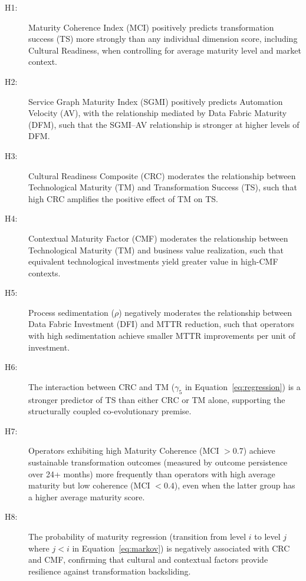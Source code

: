 \documentclass[12pt,a4paper]{article}
\begin{document}
\begin{description}
\item[H1:] Maturity Coherence Index (MCI) positively predicts transformation success (TS) more strongly than any individual dimension score, including Cultural Readiness, when controlling for average maturity level and market context.

\item[H2:] Service Graph Maturity Index (SGMI) positively predicts Automation Velocity (AV), with the relationship mediated by Data Fabric Maturity (DFM), such that the SGMI--AV relationship is stronger at higher levels of DFM.

\item[H3:] Cultural Readiness Composite (CRC) moderates the relationship between Technological Maturity (TM) and Transformation Success (TS), such that high CRC amplifies the positive effect of TM on TS.

\item[H4:] Contextual Maturity Factor (CMF) moderates the relationship between Technological Maturity (TM) and business value realization, such that equivalent technological investments yield greater value in high-CMF contexts.

\item[H5:] Process sedimentation ($\rho$) negatively moderates the relationship between Data Fabric Investment (DFI) and MTTR reduction, such that operators with high sedimentation achieve smaller MTTR improvements per unit of investment.

\item[H6:] The interaction between CRC and TM ($\gamma_5$ in Equation~\ref{eq:regression}) is a stronger predictor of TS than either CRC or TM alone, supporting the structurally coupled co-evolutionary premise.

\item[H7:] Operators exhibiting high Maturity Coherence (MCI $> 0.7$) achieve sustainable transformation outcomes (measured by outcome persistence over 24+ months) more frequently than operators with high average maturity but low coherence (MCI $< 0.4$), even when the latter group has a higher average maturity score.

\item[H8:] The probability of maturity regression (transition from level $i$ to level $j$ where $j < i$ in Equation~\ref{eq:markov}) is negatively associated with CRC and CMF, confirming that cultural and contextual factors provide resilience against transformation backsliding.
\end{description}
\end{document}
